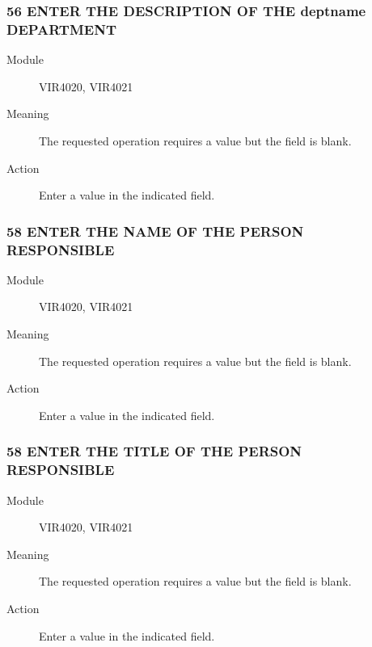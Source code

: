 \documentclass[letterpaper,10pt,english]{sphinxmanual}
\begin{document}
\subsubsection{56 ENTER THE DESCRIPTION OF THE deptname DEPARTMENT}
\label{\detokenize{messages:enter-the-description-of-the-deptname-department}}\begin{description}
\item[{Module}] \leavevmode
VIR4020, VIR4021

\item[{Meaning}] \leavevmode
The requested operation requires a value but the field is blank.

\item[{Action}] \leavevmode
Enter a value in the indicated field.

\end{description}


\subsubsection{58 ENTER THE NAME OF THE PERSON RESPONSIBLE}
\label{\detokenize{messages:enter-the-name-of-the-person-responsible}}\begin{description}
\item[{Module}] \leavevmode
VIR4020, VIR4021

\item[{Meaning}] \leavevmode
The requested operation requires a value but the field is blank.

\item[{Action}] \leavevmode
Enter a value in the indicated field.

\end{description}


\subsubsection{58 ENTER THE TITLE OF THE PERSON RESPONSIBLE}
\label{\detokenize{messages:enter-the-title-of-the-person-responsible}}\begin{description}
\item[{Module}] \leavevmode
VIR4020, VIR4021

\item[{Meaning}] \leavevmode
The requested operation requires a value but the field is blank.

\item[{Action}] \leavevmode
Enter a value in the indicated field.

\end{description}
\end{document}
